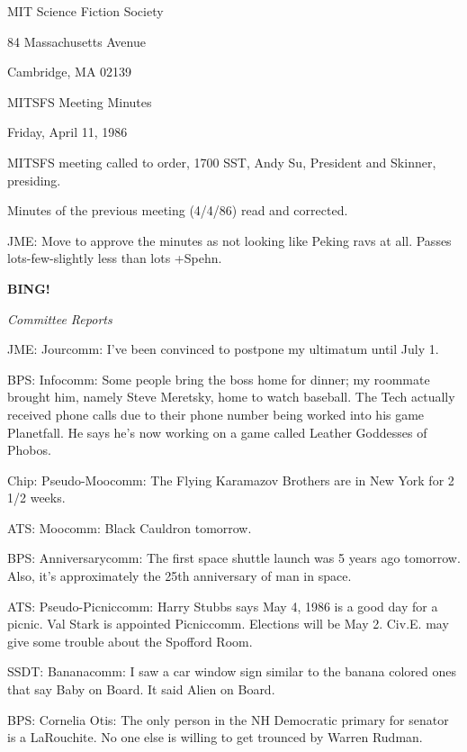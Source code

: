 \documentclass[12pt]{article}
\newcommand{\bing}{{\bf BING!} }
\newcommand{\goto}[1]{\bing \vskip 12pt \centerline{{\em{#1}}}}
\begin{document}
\begin{center}

MIT Science Fiction Society 

84 Massachusetts Avenue

Cambridge, MA 02139

\vspace{12pt}

MITSFS Meeting Minutes 

Friday, April 11, 1986

\end{center}
 
\vspace{18pt}

\setlength{\parskip}{6pt}

\noindent
MITSFS meeting called to order, 1700 SST,
Andy Su, President and Skinner, presiding.

Minutes of the previous meeting (4/4/86) read and corrected.

JME: Move to approve the minutes as not looking like Peking ravs at all. Passes lots-few-slightly less than lots +Spehn.

\goto{Committee Reports}

JME: Jourcomm: I've been convinced to postpone my ultimatum until July 1.

BPS: Infocomm: Some people bring the boss home for dinner; my roommate brought him, namely Steve Meretsky, home to watch baseball. The Tech actually received phone calls due to their phone number being worked into his game Planetfall. He says he's now working on a game called Leather Goddesses of Phobos.

Chip: Pseudo-Moocomm: The Flying Karamazov Brothers are in New York for 2 1/2 weeks.

ATS: Moocomm: Black Cauldron tomorrow.

BPS: Anniversarycomm: The first space shuttle launch was 5 years ago tomorrow. Also, it's approximately the 25th anniversary of man in space.

ATS: Pseudo-Picniccomm: Harry Stubbs says May 4, 1986 is a good day for a picnic. Val Stark is appointed Picniccomm. Elections will be May 2. Civ.E. may give some trouble about the Spofford Room.

SSDT: Bananacomm: I saw a car window sign similar to the banana colored ones that say Baby on Board. It said Alien on Board.

BPS: Cornelia Otis: The only person in the NH Democratic primary for senator is a LaRouchite. No one else is willing to get trounced by Warren Rudman.
\end{document}
